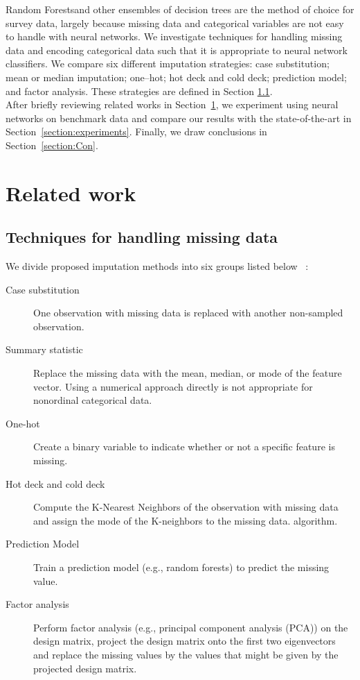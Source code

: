 \documentclass[10pt,twocolumn,letterpaper]{article}
\begin{document}
Random Forestsand other ensembles of decision trees are the method of choice for survey data, largely because missing data and categorical variables are not easy to handle with neural networks. We investigate techniques for handling missing data and
encoding categorical data such that it is appropriate to neural network classifiers. We compare six different imputation strategies:  case substitution; mean or median imputation; one--hot; hot deck and cold deck; prediction model; and factor analysis. These strategies are defined in Section \ref{section:techniques}. \\

After briefly reviewing related works in Section~\ref{section:rw}, we experiment using neural networks on benchmark data and compare our results with the state-of-the-art in Section~\ref{section:experiments}. Finally, we draw conclusions in Section~\ref{section:Con}.

\section{Related work}  \label{section:rw}

\subsection{Techniques for handling missing data} \label{section:techniques}
We divide proposed  imputation methods into six groups listed
below ~\cite{batista2003analysis}:

\begin{description}
\item[Case substitution] One observation with missing data is replaced with
another non-sampled observation.
\item[Summary statistic] Replace the missing data with the mean, median, or mode of
    the feature vector. Using a numerical approach directly is not appropriate for nonordinal categorical data.
\item[One-hot] Create a binary variable to indicate whether or not a specific
    feature is missing. %
\item[Hot deck and cold deck] Compute the K-Nearest Neighbors of the
    observation with missing data and assign the mode of the K-neighbors
    to the missing data. %
    algorithm.
\item[Prediction Model] Train a prediction model (e.g., random forests) to predict the missing value. %
\item[Factor analysis] Perform factor analysis (e.g., principal component analysis (PCA)) on the design
    matrix, project the design matrix onto the first two eigenvectors and
    replace the missing values by the values that might be given by the
    projected design matrix.
\end{description}
\end{document}
